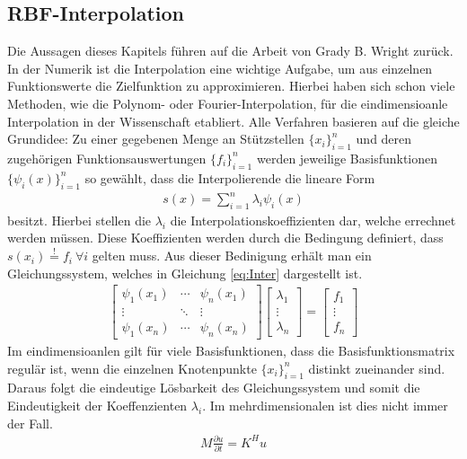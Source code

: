 \documentclass[a4paper,11pt]{article}
\begin{document}
\subsection{RBF-Interpolation}
Die Aussagen dieses Kapitels führen auf die Arbeit von Grady B. Wright \cite{wright2003radial} zurück.\\
In der Numerik ist die Interpolation eine wichtige Aufgabe, um aus einzelnen Funktionswerte die Zielfunktion zu approximieren. Hierbei haben sich schon viele Methoden, wie die Polynom- oder Fourier-Interpolation, für die eindimensioanle Interpolation in der Wissenschaft etabliert. Alle Verfahren basieren auf die gleiche Grundidee: Zu einer gegebenen Menge an Stützstellen $\{x_i\}_{i=1}^n$ und deren zugehörigen Funktionsauswertungen $\{f_i\}_{i=1}^n$ werden jeweilige Basisfunktionen $\{\psi_i(x)\}_{i=1}^n$ so gewählt, dass die Interpolierende die lineare Form
\begin{align}
 s(x)=\sum_{i=1}^n\lambda_i\psi_i(x)
\end{align}
besitzt. Hierbei stellen die $\lambda_i$ die Interpolationskoeffizienten dar, welche errechnet werden müssen. Diese Koeffizienten werden durch die Bedingung definiert, dass $s(x_i)\overset{!}{=}f_i~\forall i$ gelten muss. Aus dieser Bedinigung erhält man ein Gleichungssystem, welches in Gleichung \eqref{eq:Inter} dargestellt ist.
\begin{align}
\begin{bmatrix}
 \psi_1(x_1) & \cdots & \psi_n(x_1) \\ \vdots & \ddots & \vdots \\ \psi_1(x_n) & \cdots & \psi_n(x_n)
\end{bmatrix}
\begin{bmatrix}
 \lambda_1 \\ \vdots \\ \lambda_n
\end{bmatrix}
=
\begin{bmatrix}
 f_1 \\ \vdots \\ f_n
\end{bmatrix}\label{eq:Inter}
\end{align}
Im eindimensioanlen gilt für viele Basisfunktionen, dass die Basisfunktionsmatrix regulär ist, wenn die einzelnen Knotenpunkte $\{x_i\}_{i=1}^n$ distinkt zueinander sind. Daraus folgt die eindeutige Lösbarkeit des Gleichungssystem und somit die Eindeutigkeit der Koeffenzienten $\lambda_i$. Im mehrdimensionalen ist dies nicht immer der Fall. \cite{de2013four}
\begin{align}
 M\frac{\partial u}{\partial t}=K^Hu\label{eq:algTrans}
\end{align}
\pagebreak
\end{document}
